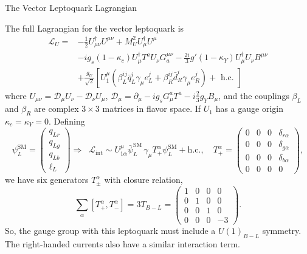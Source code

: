 \documentclass{../bredelebeamer}
\begin{document}
\begin{frame}{The Vector Leptoquark Lagrangian}
	
	The full Lagrangian for the vector leptoquark is
	\begin{align*}
		\mathcal{L}_{U}=&-\frac{1}{2} U_{\mu \nu}^{\dagger} U^{\mu \nu}+M_{U}^{2} U_{\mu}^{\dagger} U^{\mu}\\&-i g_{s}\left(1-\kappa_{c}\right) U_{\mu}^{\dagger} T^{a} U_{\nu} G^{\mu \nu}_a -\frac{2 i}{3} g'\left(1-\kappa_{Y}\right) U_{\mu}^{\dagger} U_{\nu} B^{\mu \nu}\\
		&+\frac{g_{U}}{\sqrt{2}}\left[U_{1}^{\mu}\left(\beta_{L}^{i j} \bar{q}_{L}^{i} \gamma_{\mu} e_{L}^{j}+\beta_{R}^{i j} \bar{d}_{R}^{i} \gamma_{\mu} e_{R}^{j}
		\right)+\text { h.c. }\right]
	\end{align*}
	where $U_{\mu \nu}=\mathcal D_{\mu} U_{\nu}-\mathcal D_{\nu} U_{\mu}$, $\mathcal D_{\mu}=\partial_{\mu}-i g_{s} G_{\mu}^{a} T^{a}-i \frac{2}{3} g_{Y} B_{\mu}$, and the couplings $\beta_{L}$ and $\beta_{R}$ are complex $3 \times 3$ matrices in flavor space. If $U_1$ has a gauge origin $\kappa_{c}=\kappa_{Y}=0$.
	\pause
	Defining 
	$$
	\psi_{L}^{\mathrm{SM}}=\begin{pmatrix}
		q_{Lr}\\ q_{Lg}\\ q_{Lb}\\ \ell_L
	\end{pmatrix}
	\Longrightarrow\;\;
	\mathcal{L}_{\text{int}}
	\sim U_{1\alpha}^\mu \bar{\psi}_{L}^{\mathrm{SM}}\, \gamma_{\mu} T_{+}^{\alpha } \psi_{L}^{\mathrm{SM}} + \text{h.c.},
	\quad
	T_{+}^{\alpha}=\begin{pmatrix}
		0 & 0 & 0 & \delta_{r\alpha}\\
		0 & 0 & 0 & \delta_{g\alpha}\\
		0 & 0 & 0 & \delta_{b\alpha}\\
		0 & 0 & 0 & 0
	\end{pmatrix},
	$$
	we have six generators $T_{\pm}^{\alpha }$ with closure relation,
	$$
	\sum_{\alpha} \left[{T_{+}^{\alpha }},{T_{-}^{\alpha}}\right] =
	3 T_{B-L}=\begin{pmatrix}
		1 & 0 & 0 & 0\\
		0 & 1 & 0 & 0\\
		0 & 0 & 1 & 0\\
		0 & 0 & 0 & -3
	\end{pmatrix}.
	$$
	So, the gauge group with this leptoquark must include a $U(1)_{B-L}$ symmetry. The right-handed currents also have a similar interaction term.
\end{frame}
\end{document}
